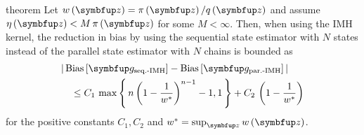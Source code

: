 
\begin{theoremEnd}{theorem}\label{thm:thm_bias_diff}
  Let \(w\left(\vz\right) = \pi\left(\vz\right) / q\left(\vz\right)\) and assume \(\eta\left(\vz\right) < M \, \pi\left(\vz\right)\) for some \(M < \infty\).
  Then, when using the IMH kernel, the reduction in bias by using the sequential state estimator with \(N\) states instead of the parallel state estimator with \(N\) chains is bounded as
  {\small
  \begin{align*}
    &\abs{
      \text{Bias}\left[\vg_{\text{seq.-IMH}}\right]
      -
      \text{Bias}\left[\vg_{\text{par.-IMH}}\right]
    }
    \\
    &\quad\leq
    C_1 \, \max\left\{\, n \, {\left(1 - \frac{1}{w^*} \right)}^{n-1} - 1, 1 \,\right\}
    +
    C_2 \, \left( 1 - \frac{1}{w^*} \right)
  \end{align*}
  }
  for the positive constants \(C_1, C_2\) and \(w^* = \sup_{\vz} w\left(\vz\right)\).
\end{theoremEnd}
